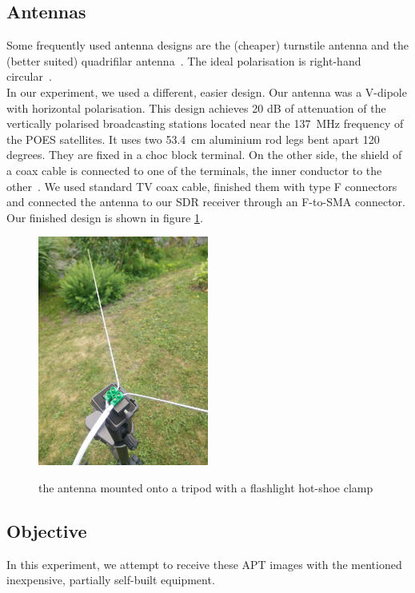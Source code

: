 \documentclass[conference]{IEEEtran}
\begin{document}
\subsection{Antennas} \label{sec:NOAAantennas}
Some frequently used antenna designs are the (cheaper) turnstile antenna and the (better suited) quadrifilar antenna~\cite[45p]{NOAA19building}. The ideal polarisation is right-hand circular~\cite[44p]{NOAA19building}.\\
In our experiment, we used a different, easier design. Our antenna was a V-dipole with horizontal polarisation. This design achieves 20 dB of attenuation of the vertically polarised broadcasting stations located near the 137~MHz frequency of the POES satellites. It uses two 53.4~cm aluminium rod legs bent apart 120 degrees. They are fixed in a choc block terminal. On the other side, the shield of a coax cable is connected to one of the terminals, the inner conductor to the other~\cite{Adam15antenna}. We used standard TV coax cable, finished them with type F connectors and connected the antenna to our SDR receiver through an F-to-SMA connector. Our finished design is shown in figure \ref{fig:vdipolefinished}.
\begin{figure}
	\centering
	\caption{the antenna mounted onto a tripod with a flashlight hot-shoe clamp}
	\includegraphics[width=0.5\textwidth]{v-dipole-finished} \label{fig:vdipolefinished}
\end{figure}
\subsection{Objective}
In this experiment, we attempt to receive these APT images with the mentioned inexpensive, partially self-built equipment.
\end{document}
